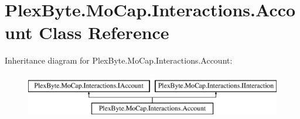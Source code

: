 \hypertarget{class_plex_byte_1_1_mo_cap_1_1_interactions_1_1_account}{}\section{Plex\+Byte.\+Mo\+Cap.\+Interactions.\+Account Class Reference}
\label{class_plex_byte_1_1_mo_cap_1_1_interactions_1_1_account}
Inheritance diagram for Plex\+Byte.\+Mo\+Cap.\+Interactions.\+Account\+:\begin{figure}[H]
\begin{center}
\leavevmode
\includegraphics[height=2.000000cm]{class_plex_byte_1_1_mo_cap_1_1_interactions_1_1_account}
\end{center}
\end{figure}
